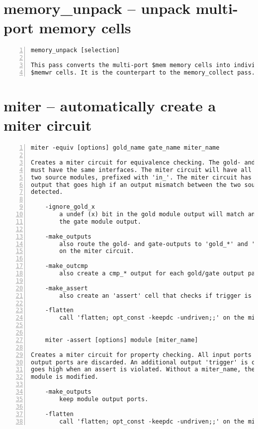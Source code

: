 \section{memory\_unpack -- unpack multi-port memory cells}
\label{cmd:memory_unpack}
\begin{lstlisting}[numbers=left,frame=single]
    memory_unpack [selection]

This pass converts the multi-port $mem memory cells into individual $memrd and
$memwr cells. It is the counterpart to the memory_collect pass.
\end{lstlisting}

\section{miter -- automatically create a miter circuit}
\label{cmd:miter}
\begin{lstlisting}[numbers=left,frame=single]
    miter -equiv [options] gold_name gate_name miter_name

Creates a miter circuit for equivalence checking. The gold- and gate- modules
must have the same interfaces. The miter circuit will have all inputs of the
two source modules, prefixed with 'in_'. The miter circuit has a 'trigger'
output that goes high if an output mismatch between the two source modules is
detected.

    -ignore_gold_x
        a undef (x) bit in the gold module output will match any value in
        the gate module output.

    -make_outputs
        also route the gold- and gate-outputs to 'gold_*' and 'gate_*' outputs
        on the miter circuit.

    -make_outcmp
        also create a cmp_* output for each gold/gate output pair.

    -make_assert
        also create an 'assert' cell that checks if trigger is always low.

    -flatten
        call 'flatten; opt_const -keepdc -undriven;;' on the miter circuit.


    miter -assert [options] module [miter_name]

Creates a miter circuit for property checking. All input ports are kept,
output ports are discarded. An additional output 'trigger' is created that
goes high when an assert is violated. Without a miter_name, the existing
module is modified.

    -make_outputs
        keep module output ports.

    -flatten
        call 'flatten; opt_const -keepdc -undriven;;' on the miter circuit.
\end{lstlisting}

